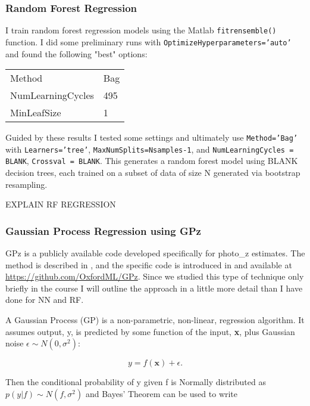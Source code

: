 \documentclass[13pt]{amsart}
\newcommand{\bx}{\textbf{x}}
\newcommand{\equ}[1]{\[#1\]}
\newcommand{\equin}[1]{\(#1\)}
\begin{document}
    \subsubsection{Random Forest Regression}

      I train random forest regression models using the Matlab \texttt{fitrensemble()} function. I did some preliminary runs with \texttt{OptimizeHyperparameters='auto'} and found the following "best" options:

        \begin{table}[H]
        \begin{tabular}{ll}
          Method            & Bag \\
          NumLearningCycles & 495 \\
          MinLeafSize       & 1
        \end{tabular}
        \end{table}

        Guided by these results I tested some settings and ultimately use \texttt{Method='Bag'} with \texttt{Learners='tree'}, \texttt{MaxNumSplits=Nsamples-1}, and \texttt{NumLearningCycles = BLANK}, \texttt{Crossval = BLANK}. This generates a random forest model using BLANK decision trees, each trained on a subset of data of size N generated via bootstrap resampling.

        EXPLAIN RF REGRESSION




    \subsubsection{Gaussian Process Regression using GPz}
      \label{gpz}

      GPz is a publicly available code developed specifically for photo\_z estimates. The method is described in \cite{sgp}, and the specific code is introduced in \cite{gpz} and available at \url{https://github.com/OxfordML/GPz}. Since we studied this type of technique only briefly in the course I will outline the approach in a little more detail than I have done for NN and RF.

      A Gaussian Process (GP) is a non-parametric, non-linear, regression algorithm. It assumes output, y, is predicted by some function of the input, \bx, plus Gaussian noise \equin{\epsilon \sim N(0,\sigma^2)}:

      \equ{y = f(\bx)+ \epsilon.}

      Then the conditional probability of y given f is Normally distributed as
      \equin{p(y|f) \sim N(f,\sigma^2)} and Bayes' Theorem can be used to write
\end{document}
